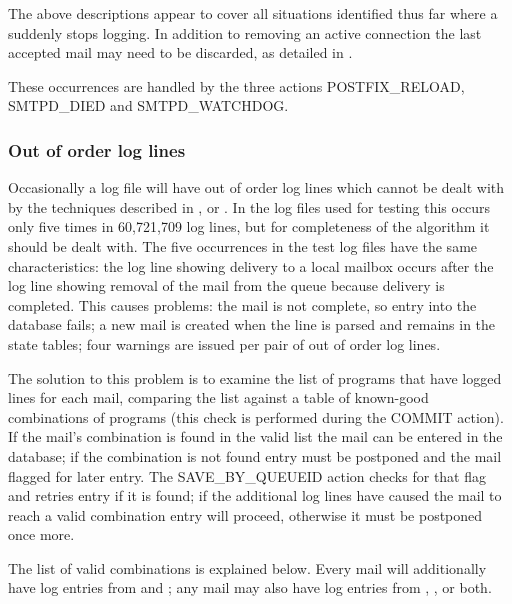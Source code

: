 The above descriptions appear to cover all situations identified thus far
where a  suddenly stops logging.  In addition to removing an
active connection the last accepted mail may need to be discarded, as
detailed in .

These occurrences are handled by the three actions POSTFIX\_RELOAD,
SMTPD\_DIED and SMTPD\_WATCHDOG\@.

\subsubsection{Out of order log lines}

\label{out of order log lines}

Occasionally a log file will have out of order log lines which cannot be
dealt with by the techniques described in ,  or .  In the \numberOFlogFILES{} log files used for testing this
occurs only five times in 60,721,709 log lines, but for completeness of the
algorithm it should be dealt with.  The five occurrences in the test log
files have the same characteristics: the  log line showing
delivery to a local mailbox occurs after the  log line showing
removal of the mail from the queue because delivery is completed.  This
causes problems: the mail is not complete, so entry into the database
fails; a new mail is created when the  line is parsed and
remains in the state tables; four warnings are issued per pair of out of
order log lines.

The solution to this problem is to examine the list of programs that have
logged lines for each mail, comparing the list against a table of
known-good combinations of programs (this check is performed during the
COMMIT action).  If the mail's combination is found in the valid list the
mail can be entered in the database; if the combination is not found entry
must be postponed and the mail flagged for later entry.  The
SAVE\_BY\_QUEUEID action checks for that flag and retries entry if it is
found; if the additional log lines have caused the mail to reach a valid
combination entry will proceed, otherwise it must be postponed once more.

The list of valid combinations is explained below.  Every mail will
additionally have log entries from  and ; any
mail may also have log entries from , , or
both.

